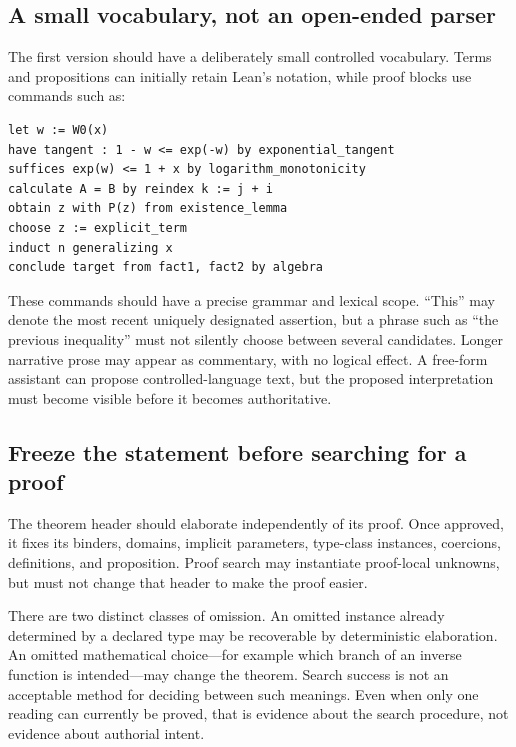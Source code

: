 \documentclass[11pt,a4paper]{article}
\theoremstyle{remark}
\begin{document}
\subsection{A small vocabulary, not an open-ended parser}
The first version should have a deliberately small controlled vocabulary. Terms and propositions can initially retain Lean's notation, while proof blocks use commands such as:
\par\noindent\begin{minipage}{\linewidth}
\begin{lstlisting}[caption={Illustrative vocabulary, not executable Motive code.}]
let w := W0(x)
have tangent : 1 - w <= exp(-w) by exponential_tangent
suffices exp(w) <= 1 + x by logarithm_monotonicity
calculate A = B by reindex k := j + i
obtain z with P(z) from existence_lemma
choose z := explicit_term
induct n generalizing x
conclude target from fact1, fact2 by algebra
\end{lstlisting}
\end{minipage}\par
These commands should have a precise grammar and lexical scope. ``This'' may denote the most recent uniquely designated assertion, but a phrase such as ``the previous inequality'' must not silently choose between several candidates. Longer narrative prose may appear as commentary, with no logical effect. A free-form assistant can propose controlled-language text, but the proposed interpretation must become visible before it becomes authoritative.

\subsection{Freeze the statement before searching for a proof}
The theorem header should elaborate independently of its proof. Once approved, it fixes its binders, domains, implicit parameters, type-class instances, coercions, definitions, and proposition. Proof search may instantiate proof-local unknowns, but must not change that header to make the proof easier.

There are two distinct classes of omission. An omitted instance already determined by a declared type may be recoverable by deterministic elaboration. An omitted mathematical choice---for example which branch of an inverse function is intended---may change the theorem. Search success is not an acceptable method for deciding between such meanings. Even when only one reading can currently be proved, that is evidence about the search procedure, not evidence about authorial intent.
\end{document}
